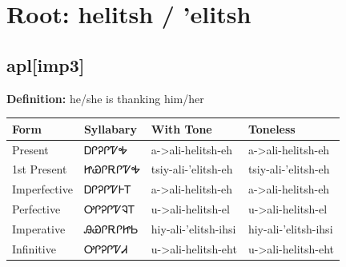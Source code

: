 \documentclass{article}%
\begin{document}
%
\normalsize%
\section*{Root: helitsh / 'elitsh}%
\subsection*{apl[imp3]}%
\textbf{Definition: }%
he/she is thanking him/her%
\\[0.5em]%
\begin{tabular}{|l|l|l|l|}%
\hline%
\textbf{Form}&\textbf{Syllabary}&\textbf{With Tone}&\textbf{Toneless}\\%
\hline%
Present&ᎠᎵᎮᎵᏤᎭ&a{-}>ali{-}helitsh{-}eh&a{-}>ali{-}helitsh{-}eh\\%
1st Present&ᏥᏯᎵᎡᎵᏤᎭ&tsiy{-}ali{-}'elitsh{-}eh&tsiy{-}ali{-}'elitsh{-}eh\\%
Imperfective&ᎠᎵᎮᎵᏤᎰᎢ&a{-}>ali{-}helitsh{-}eh&a{-}>ali{-}helitsh{-}eh\\%
Perfective&ᎤᎵᎮᎵᏤᎸᎢ&u{-}>ali{-}helitsh{-}el&u{-}>ali{-}helitsh{-}el\\%
Imperative&ᎯᏯᎵᎡᎵᏥᏏ&hiy{-}ali{-}'elitsh{-}ihsi&hiy{-}ali{-}'elitsh{-}ihsi\\%
Infinitive&ᎤᎵᎮᎵᏤᏗ&u{-}>ali{-}helitsh{-}eht&u{-}>ali{-}helitsh{-}eht\\%
\hline%
\end{tabular}%
\\[1em]%
\end{document}
